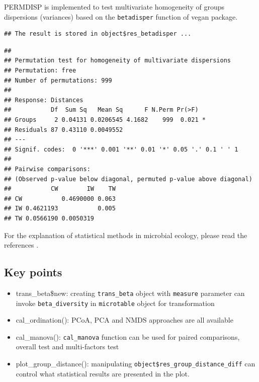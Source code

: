 \documentclass[
]{book}
\newenvironment{Shaded}{\begin{snugshade}}{\end{snugshade}}
\newcommand{\CommentTok}[1]{\textcolor[rgb]{0.56,0.35,0.01}{\textit{#1}}}
\newcommand{\FunctionTok}[1]{\textcolor[rgb]{0.00,0.00,0.00}{#1}}
\newcommand{\NormalTok}[1]{#1}
\newcommand{\SpecialCharTok}[1]{\textcolor[rgb]{0.00,0.00,0.00}{#1}}
\providecommand{\tightlist}{%
  \setlength{\itemsep}{0pt}\setlength{\parskip}{0pt}}
\begin{document}
PERMDISP\citep{Anderson_Navigating_2011} is implemented to test multivariate homogeneity of groups dispersions (variances) based on the \texttt{betadisper} function of vegan package.

\begin{Shaded}
\end{Shaded}

\begin{verbatim}
## The result is stored in object$res_betadisper ...
\end{verbatim}

\begin{Shaded}
\end{Shaded}

\begin{verbatim}
## 
## Permutation test for homogeneity of multivariate dispersions
## Permutation: free
## Number of permutations: 999
## 
## Response: Distances
##           Df  Sum Sq   Mean Sq      F N.Perm Pr(>F)  
## Groups     2 0.04131 0.0206545 4.1682    999  0.021 *
## Residuals 87 0.43110 0.0049552                       
## ---
## Signif. codes:  0 '***' 0.001 '**' 0.01 '*' 0.05 '.' 0.1 ' ' 1
## 
## Pairwise comparisons:
## (Observed p-value below diagonal, permuted p-value above diagonal)
##           CW        IW    TW
## CW           0.4690000 0.063
## IW 0.4621193           0.005
## TW 0.0566190 0.0050319
\end{verbatim}

For the explanation of statistical methods in microbial ecology, please read the references \citep{Ramette_Multivariate_2007, Buttigieg_guide_2014}.

\hypertarget{key-points-4}{%
\subsection{Key points}\label{key-points-4}}

\begin{itemize}
\tightlist
\item
  trans\_beta\$new: creating \texttt{trans\_beta} object with \texttt{measure} parameter can invoke \texttt{beta\_diversity} in \texttt{microtable} object for transformation
\item
  cal\_ordination(): PCoA, PCA and NMDS approaches are all available
\item
  cal\_manova(): \texttt{cal\_manova} function can be used for paired comparisons, overall test and multi-factors test
\item
  plot\_group\_distance(): manipulating \texttt{object\$res\_group\_distance\_diff} can control what statistical results are presented in the plot.
\end{itemize}
\end{document}
